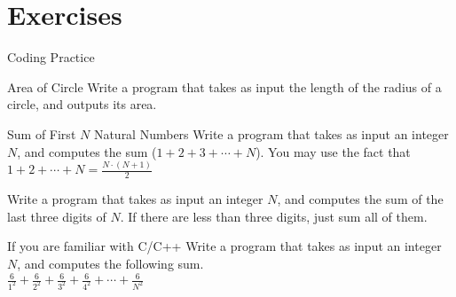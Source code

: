 \section{Exercises}

\begin{frame}[fragile]{Coding Practice}{}
    \begin{block}{Area of Circle}
        Write a program that takes as input the length of the radius of a circle, and outputs its area.
    \end{block}
    \begin{block}{Sum of First $N$ Natural Numbers}
        Write a program that takes as input an integer $N$, and computes the sum ($1+2+3+\cdots+N$).
        You may use the fact that $1+2+\cdots+N = \frac{N\cdot(N+1)}{2}$
    \end{block}
    \begin{block}{}
        Write a program that takes as input an integer $N$, and computes the sum
        of the last three digits of $N$.
        If there are less than three digits, just sum all of them.
    \end{block}
    \begin{block}{If you are familiar with C/C++}
        Write a program that takes as input an integer $N$, and computes the following sum.\\
        $\frac{6}{1^2}+\frac{6}{2^2}+\frac{6}{3^2}+\frac{6}{4^2}+\cdots+\frac{6}{N^2}$
    \end{block}
\end{frame}
